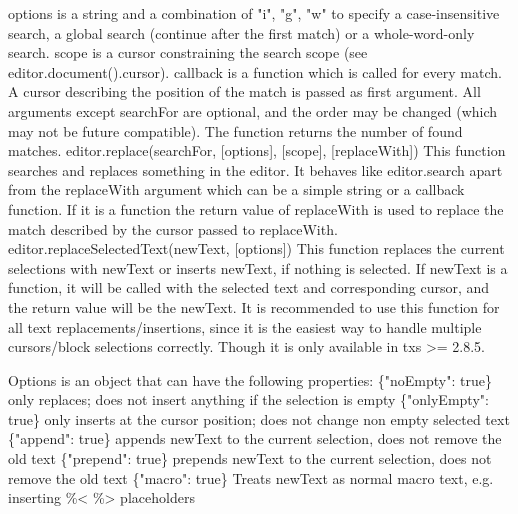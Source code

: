 \documentclass{article}
\begin{document}
	options is a string and a combination of "i", "g", "w" to specify a case-insensitive search, a global search (continue after the first match) or a whole-word-only search.
	scope is a cursor constraining the search scope (see editor.document().cursor).
	callback is a function which is called for every match. A cursor describing the position of the match is passed as first argument.
	All arguments except searchFor are optional, and the order may be changed (which may not be future compatible). The function returns the number of found matches.
	editor.replace(searchFor, [options], [scope], [replaceWith])	This function searches and replaces something in the editor. It behaves like editor.search apart from the replaceWith argument which can be a simple string or a callback function. If it is a function the return value of replaceWith is used to replace the match described by the cursor passed to replaceWith.
	editor.replaceSelectedText(newText, [options])	This function replaces the current selections with newText or inserts newText, if nothing is selected.
	If newText is a function, it will be called with the selected text and corresponding cursor, and the return value will be the newText.
	It is recommended to use this function for all text replacements/insertions, since it is the easiest way to handle multiple cursors/block selections correctly. Though it is only available in txs >= 2.8.5.
	
	Options is an object that can have the following properties:
	\{"noEmpty": true\} only replaces; does not insert anything if the selection is empty
	\{"onlyEmpty": true\} only inserts at the cursor position; does not change non empty selected text
	\{"append": true\} appends newText to the current selection, does not remove the old text
	\{"prepend": true\} prepends newText to the current selection, does not remove the old text
	\{"macro": true\} Treats newText as normal macro text, e.g. inserting \%< \%> placeholders
	
\end{document}
